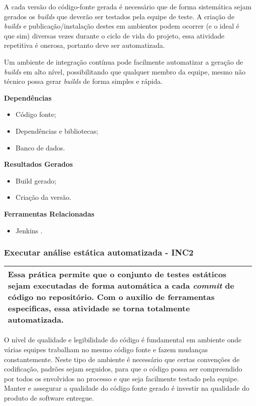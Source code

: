 A cada versão do código-fonte gerada é necessário que de forma sistemática sejam gerados os \textit{builds} que deverão ser testados pela equipe de teste. A criação de \textit{builds} e publicação/instalação destes em ambientes podem ocorrer (e o ideal é que sim) diversas vezes durante o ciclo de vida do projeto, essa atividade repetitiva é onerosa, portanto deve ser automatizada.

Um ambiente de integração contínua pode facilmente automatizar a geração de \textit{builds} em alto nível, possibilitando que qualquer membro da equipe, mesmo não técnico possa gerar \textit{builds} de forma simples e rápida.

\textbf{Dependências}
\begin{itemize}
    \item Código fonte;
    \item Dependências e bibliotecas;
    \item Banco de dados.
\end{itemize}

\textbf{ Resultados Gerados }
\begin{itemize}
    \item Build gerado;
    \item Criação da versão.
\end{itemize}

\textbf{ Ferramentas Relacionadas }
\begin{itemize}
    \item Jenkins \cite{Jenkins}.
\end{itemize}

\subsubsection{Executar análise estática automatizada - INC2}
\label{sec:inc2}

\begin{table}[H]
\centering
\begin{tabular}{|p{130mm}|}
\hline
Essa prática permite que o conjunto de testes estáticos sejam executadas de forma automática a cada \textit{commit} de código no repositório. Com o auxilio de ferramentas especificas, essa atividade se torna totalmente automatizada. \\ 
\hline
\end{tabular}
\end{table}

O nível de qualidade e legibilidade do código é fundamental em ambiente onde várias equipes trabalham no mesmo código fonte e fazem mudanças constantemente. Neste tipo de ambiente é necessário que certas convenções de codificação, padrões sejam seguidos, para que o código possa ser compreendido por todos os envolvidos no processo e que seja facilmente testado pela equipe. Manter e assegurar a qualidade do código fonte gerado é investir na qualidade do produto de software entregue.

